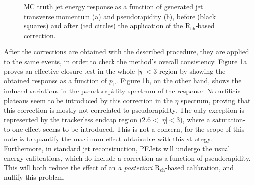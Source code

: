 \documentclass{cmspaper}
\begin{document}
\begin{figure}[tb]
\centering
{}
\caption{MC truth jet energy response as a function of generated jet transverse momentum (a) and pseudorapidity (b), before (black squares) and after (red circles) the application of the R$_{\mathrm{ch}}$-based correction. \label{fig:response}}
\end{figure}

After the corrections are obtained with the described procedure, they are applied to the same events, in order to check the method's overall consistency. Figure \ref{fig:response}a proves an effective closure test in the whole $|\eta|<3$ region by showing the obtained response as a function of $p_{\mathrm{T}}$. Figure \ref{fig:response}b, on the other hand, shows the induced variations in the pseudorapidity spectrum of the response. No artificial plateaus seem to be introduced by this correction in the $\eta$ spectrum, proving that this correction is mostly not correlated to pseudorapidity. The only exception is represented by the trackerless endcap region ($2.6 < |\eta| < 3 $), where a saturation-to-one effect seems to be introduced. This is not a concern, for the scope of this note is to quantify the maximum effect obtainable with this strategy. Furthermore, in standard jet reconstruction, PFJets will undergo the usual energy calibrations, which do include a correction as a function of pseudorapidity. This will both reduce the effect of an {\em a posteriori} R$_{\mathrm{ch}}$-based calibration, and nullify this problem.
\end{document}
